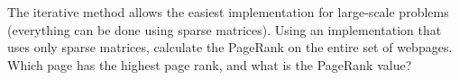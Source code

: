 \begin{problem}
The iterative method allows the easiest implementation for large-scale problems (everything can be done using sparse matrices).
Using an implementation that uses only sparse matrices, calculate the PageRank on the entire set of webpages.
Which page has the highest page rank, and what is the PageRank value?
\end{problem}

